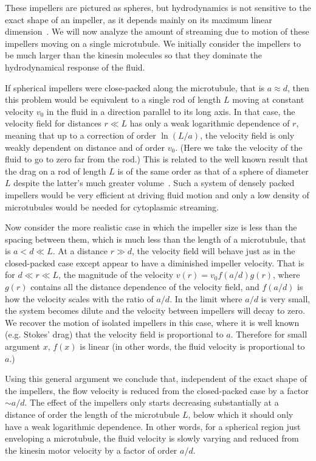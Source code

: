 \documentclass[11pt]{ucthesis}
\begin{document}
These impellers are pictured as spheres, but hydrodynamics is not sensitive to
the exact shape of an impeller, as it depends mainly on its maximum linear dimension~\cite{BergRandomWalksinBiology}. 
We will
now analyze the amount of streaming due to motion of these impellers
moving on a single microtubule. We initially consider the impellers to be much larger than
the kinesin molecules so that they dominate the hydrodynamical response
of the fluid.

If spherical impellers were close-packed along the microtubule, that is $a \approx
d$, then this problem would be equivalent to a single rod of length $L$
moving at constant velocity $v_0$ in the fluid in a direction parallel
to its long axis.  In that case, the velocity field for distances
$r \ll L$ has only a weak logarithmic dependence of $r$, meaning that up
to a correction of order $\ln(L/a)$, the velocity field is only weakly
dependent on distance and of order $v_0$. (Here we take the velocity of the fluid
to go to zero far from the rod.)
This is related to the well
known result that the drag on a rod of length $L$ is of the same order
as that of a sphere of diameter $L$ despite the latter's much greater volume~\cite{BergRandomWalksinBiology}. Such a system of densely packed impellers would
be very efficient at driving fluid motion and only a low density of microtubules
would be needed for cytoplasmic streaming.

Now consider the more realistic case in which the impeller size is less than
the spacing between them, which is much less than the length of a
microtubule, that is $a < d \ll L$.  At a distance $r \gg d$, the
velocity field will behave just as in the closed-packed case except appear
to have a diminished impeller velocity. That is for $d \ll r \ll L$,
the magnitude of the velocity $v(r)  = v_0 f(a/d) g(r)$, where $g(r)$
contains all the distance dependence of the velocity field, and $f(a/d)$
is how the velocity scales with the ratio of $a/d$. In the limit where
$a/d$ is very small, the system becomes dilute and the velocity between 
impellers will decay to zero. We recover the motion of isolated impellers
in this case, where it is well known (e.g. Stokes' drag) that the velocity
field is proportional to $a$. Therefore for small argument $x$, $f(x)$ is
linear (in other words, the fluid velocity is proportional to $a$.) 

Using this general argument we conclude that, independent of the exact shape of the impellers,
the flow velocity is reduced from the closed-packed case by a factor $\sim a/d$. The effect
of the impellers only starts decreasing substantially at a distance of order the
length of the microtubule $L$, below which it should only have a weak logarithmic
dependence. In other words, for a spherical region just enveloping a microtubule,
the fluid velocity is slowly varying and reduced from the kinesin motor velocity 
by a factor of order $a/d$.
\end{document}
